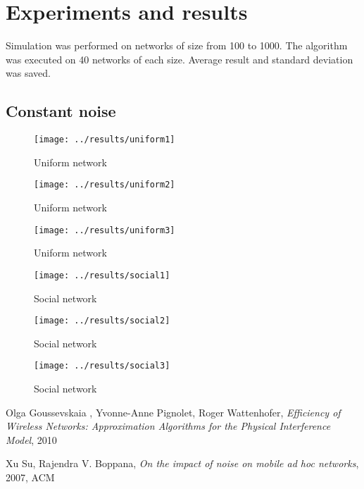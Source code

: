 \documentclass[a4paper,12pt]{report}
\begin{document}
\chapter{Experiments and results}

Simulation was performed on networks of size from 100 to 1000. The algorithm was executed on 40 networks of each size. Average result and standard deviation was saved.

\section{Constant noise}

\begin{figure}
\centering
\texttt{[image: ../results/uniform1]}
\caption{Uniform network}
\end{figure}

\begin{figure}
\centering
\texttt{[image: ../results/uniform2]}
\caption{Uniform network}
\end{figure}

\begin{figure}
\centering
\texttt{[image: ../results/uniform3]}
\caption{Uniform network}
\end{figure}

\begin{figure}
\centering
\texttt{[image: ../results/social1]}
\caption{Social network}
\end{figure}

\begin{figure}
\centering
\texttt{[image: ../results/social2]}
\caption{Social network}
\end{figure}

\begin{figure}
\centering
\texttt{[image: ../results/social3]}
\caption{Social network}
\end{figure}

\begin{thebibliography}{9}

Olga Goussevskaia , Yvonne-Anne
Pignolet, Roger Wattenhofer,
\emph{Efficiency of Wireless Networks:
Approximation Algorithms
for the Physical Interference Model},
2010

Xu Su, Rajendra V. Boppana,
\emph{On the impact of noise on mobile ad hoc networks},
2007, ACM

\end{thebibliography}
\end{document}
